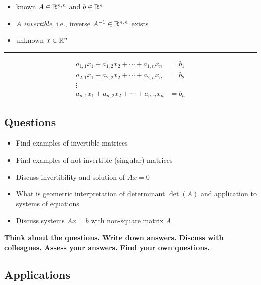 \documentclass[11pt]{article}
\providecommand{\tightlist}{%
      \setlength{\itemsep}{0pt}\setlength{\parskip}{0pt}}
\begin{document}
\begin{itemize}
\tightlist
\item
  known \(A\in \mathbb{R}^{n,n}\) and \(b\in\mathbb{R}^n\)
\item
  \(A\) \emph{invertible}, i.e., inverse \(A^{-1}\in\mathbb{R}^{n,n}\) exists
\item
  unknown \(x\in \mathbb{R}^n\)
\end{itemize}

\begin{center}\rule{0.5\linewidth}{\linethickness}\end{center}

\[\begin{aligned}
    a_{1,1} x_1 + a_{1,2} x_2 + \cdots + a_{1,n} x_n & = b_1\\
    a_{2,1} x_1 + a_{2,2} x_2 + \cdots + a_{2,n} x_n & = b_2\\
    \vdots \qquad\qquad \quad &\\
    a_{n,1} x_1 + a_{n,2} x_2 + \cdots + a_{n,n} x_n & = b_n\end{aligned}\]

    \subsection{Questions}\label{questions}

\begin{itemize}
\tightlist
\item
  Find examples of invertible matrices
\item
  Find examples of not-invertible (singular) matrices
\item
  Discuss invertibility and solution of \(Ax=0\)
\item
  What is geometric interpretation of determinant \(\det(A)\) and
  application to systems of equations
\item
  Discuss systems \(Ax=b\) with non-square matrix \(A\)
\end{itemize}

\textbf{Think about the questions. Write down answers. Discuss with
colleagues. Assess your answers. Find your own questions.}

    \subsection{Applications}\label{applications}
\end{document}

